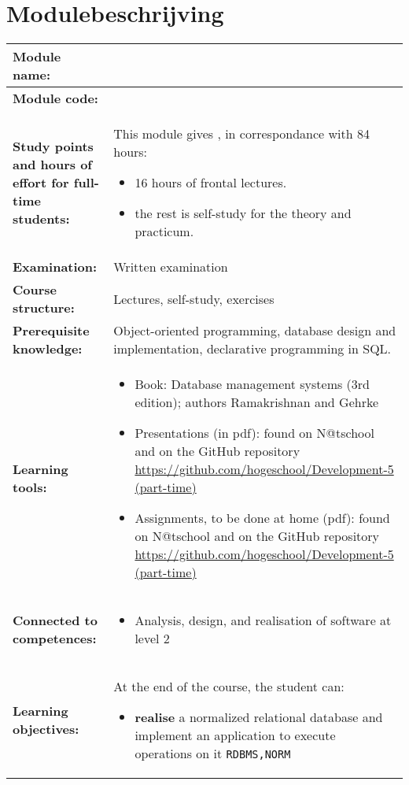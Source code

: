 \section*{Modulebeschrijving}
\begin{tabularx}{\textwidth}{|>{\columncolor{lichtGrijs}} p{}|X|}
	\hline
	\textbf{Module name:} & \modulenaam\\
	\hline
	\textbf{Module code: }& \modulecode\\
	\hline
	\textbf{Study points \newline and hours of effort for full-time students:} & This module gives \stdPunten, in correspondance with 84 hours:
	\begin{itemize}
		\item 16 hours of frontal lectures.
		\item the rest is self-study for the theory and practicum.
	\end{itemize} \\
	\hline
	\textbf{Examination:} & Written examination\\
	\hline
	\textbf{Course structure:} & Lectures, self-study, exercises\\
	\hline
	\textbf{Prerequisite knowledge:} & Object-oriented programming, database design and implementation, declarative programming in SQL. \\
	\hline
	\textbf{Learning tools:}  &
		\begin{itemize}
			\item Book: Database management systems (3rd edition); authors Ramakrishnan and Gehrke
			\item Presentations (in pdf): found on N@tschool and on the GitHub repository \url{https://github.com/hogeschool/Development-5 (part-time)}
			\item Assignments, to be done at home (pdf): found on N@tschool and on the GitHub repository \url{https://github.com/hogeschool/Development-5 (part-time)}
		\end{itemize} \\
	\hline
	\textbf{Connected to \newline competences:} &
		\begin{itemize}
			\item Analysis, design, and realisation of software at level 2
		\end{itemize} \\
	\hline
	\textbf{Learning objectives:} &
		At the end of the course, the student can:
			\begin{itemize}
				\item \textbf{realise} a normalized relational database and implement an application to execute operations on it \texttt{RDBMS,NORM}


\end{itemize}
\end{tabularx}
